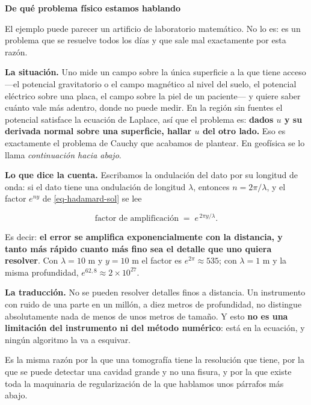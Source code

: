 \documentclass[
  spanish,
  a4paper,
]{scrbook}
\theoremstyle{definition}
\theoremstyle{plain}
\theoremstyle{definition}
\theoremstyle{plain}
\theoremstyle{definition}
\theoremstyle{remark}
\begin{document}
\begin{tcolorbox}[enhanced jigsaw, arc=.35mm, bottomrule=.15mm, breakable, colback=white, colframe=quarto-callout-important-color-frame, left=2mm, leftrule=.75mm, opacityback=0, rightrule=.15mm, toprule=.15mm]
\begin{minipage}[t]{5.5mm}
\textcolor{quarto-callout-important-color}{\faExclamation}
\end{minipage}%
\begin{minipage}[t]{\textwidth - 5.5mm}

\vspace{-3mm}\textbf{De qué problema físico estamos hablando}\vspace{3mm}

El ejemplo puede parecer un artificio de laboratorio matemático. No lo
es: es un problema que se resuelve todos los días y que sale mal
exactamente por esta razón.

\textbf{La situación.} Uno mide un campo sobre la única superficie a la
que tiene acceso ---el potencial gravitatorio o el campo magnético al
nivel del suelo, el potencial eléctrico sobre una placa, el campo sobre
la piel de un paciente--- y quiere saber cuánto vale más adentro, donde
no puede medir. En la región sin fuentes el potencial satisface la
ecuación de Laplace, así que el problema es: \textbf{dados \(u\) y su
derivada normal sobre una superficie, hallar \(u\) del otro lado.} Eso
es exactamente el problema de Cauchy que acabamos de plantear. En
geofísica se lo llama \emph{continuación hacia abajo}.

\textbf{Lo que dice la cuenta.} Escribamos la ondulación del dato por su
longitud de onda: si el dato tiene una ondulación de longitud
\(\lambda\), entonces \(n = 2\pi/\lambda\), y el factor \(e^{ny}\) de
\ref{eq-hadamard-sol} se lee

\[
\text{factor de amplificación} \;=\; e^{\,2\pi y/\lambda} .
\]

Es decir: \textbf{el error se amplifica exponencialmente con la
distancia, y tanto más rápido cuanto más fino sea el detalle que uno
quiera resolver}. Con \(\lambda = 10\) m y \(y = 10\) m el factor es
\(e^{2\pi} \approx 535\); con \(\lambda = 1\) m y la misma profundidad,
\(e^{62{,}8} \approx
2\times10^{27}\).

\textbf{La traducción.} No se pueden resolver detalles finos a
distancia. Un instrumento con ruido de una parte en un millón, a diez
metros de profundidad, no distingue absolutamente nada de menos de unos
metros de tamaño. Y esto \textbf{no es una limitación del instrumento ni
del método numérico}: está en la ecuación, y ningún algoritmo la va a
esquivar.

Es la misma razón por la que una tomografía tiene la resolución que
tiene, por la que se puede detectar una cavidad grande y no una fisura,
y por la que existe toda la maquinaria de regularización de la que
hablamos unos párrafos más abajo.

\end{minipage}%
\end{tcolorbox}
\end{document}
